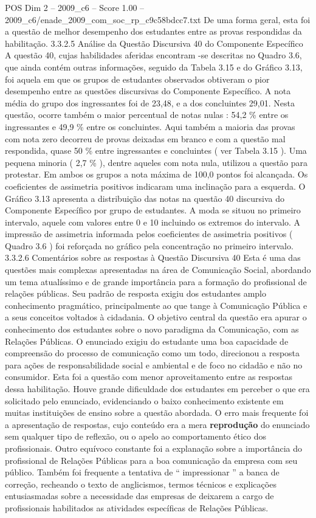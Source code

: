 \begin{textsample}{POS Dim 2 – 2009\_c6 – Score 1.00 – 2009\_c6/enade\_2009\_com\_soc\_rp\_c9c58bdcc7.txt}
De uma forma geral, esta foi a questão de melhor desempenho dos estudantes entre as provas respondidas da habilitação. 3.3.2.5 Análise da Questão Discursiva 40 do Componente Específico A questão 40, cujas habilidades aferidas encontram -se descritas no Quadro 3.6, que ainda contém outras informações, seguido da Tabela 3.15 e do Gráfico 3.13, foi aquela em que os grupos de estudantes observados obtiveram o pior desempenho entre as questões discursivas do Componente Específico.
A nota média do grupo dos ingressantes foi de 23,48, e a dos concluintes 29,01.
Nesta questão, ocorre também o maior percentual de notas nulas : 54,2 \% entre os ingressantes e 49,9 \% entre os concluintes.
Aqui também a maioria das provas com nota zero decorreu de provas deixadas em branco e com a questão mal respondida, quase 50 \% entre ingressantes e concluintes ( ver Tabela 3.15 ).
Uma pequena minoria ( 2,7 \% ), dentre aqueles com nota nula, utilizou a questão para protestar.
Em ambos os grupos a nota máxima de 100,0 pontos foi alcançada.
Os coeficientes de assimetria positivos indicaram uma inclinação para a esquerda.
O Gráfico 3.13 apresenta a distribuição das notas na questão 40 discursiva do Componente Específico por grupo de estudantes.
A moda se situou no primeiro intervalo, aquele com valores entre 0 e 10 incluindo os extremos do intervalo.
A impressão de assimetria informada pelos coeficientes de assimetria positivos ( Quadro 3.6 ) foi reforçada no gráfico pela concentração no primeiro intervalo. 3.3.2.6 Comentários sobre as respostas à Questão Discursiva 40 Esta é uma das questões mais complexas apresentadas na área de Comunicação Social, abordando um tema atualíssimo e de grande importância para a formação do profissional de relações públicas.
Seu padrão de resposta exigiu dos estudantes amplo conhecimento pragmático, principalmente ao que tange à Comunicação Pública e a seus conceitos voltados à cidadania.
O objetivo central da questão era apurar o conhecimento dos estudantes sobre o novo paradigma da Comunicação, com as Relações Públicas.
O enunciado exigiu do estudante uma boa capacidade de compreensão do processo de comunicação como um todo, direcionou a resposta para ações de responsabilidade social e ambiental e de foco no cidadão e não no consumidor.
Esta foi a questão com menor aproveitamento entre as respostas dessa habilitação.
Houve grande dificuldade dos estudantes em perceber o que era solicitado pelo enunciado, evidenciando o baixo conhecimento existente em muitas instituições de ensino sobre a questão abordada.
O erro mais frequente foi a apresentação de respostas, cujo conteúdo era a mera \textbf{reprodução} do enunciado sem qualquer tipo de reflexão, ou o apelo ao comportamento ético dos profissionais.
Outro equívoco constante foi a explanação sobre a importância do profissional de Relações Públicas para a boa comunicação da empresa com seu público.
Também foi frequente a tentativa de “ impressionar ” a banca de correção, recheando o texto de anglicismos, termos técnicos e explicações entusiasmadas sobre a necessidade das empresas de deixarem a cargo de profissionais habilitados as atividades específicas de Relações Públicas.

\end{textsample}
